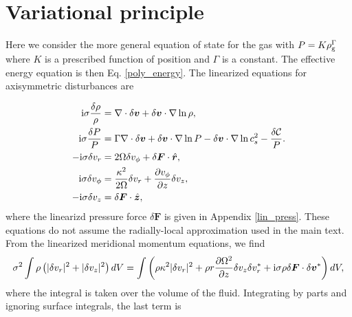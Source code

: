 \section{Variational principle}\label{var_prin}

Here we consider the more general equation of state for the gas with
$P = K \rho_\mathrm{g}^{\Gamma}$ where $K$ is a prescribed function of position
and $\Gamma$ is a constant. The effective energy equation is then
Eq. \ref{poly_energy}. The linearized equations for axisymmetric
disturbances are  

\begin{align}
  \mathrm{i}\sigma\frac{\delta\rho}{\rho} &= \nabla\cdot\delta\bm{v} +
  \delta\bm{v}\cdot\nabla\ln{\rho},\label{lin_mass_full}\\
   \mathrm{i}\sigma\frac{\delta P}{P} &= \Gamma \nabla\cdot\delta\bm{v} +
  \delta\bm{v}\cdot\nabla\ln{P} - \delta\bm{v}\cdot\nabla\ln{c_s^2} - \frac{\delta\mathcal{C}}{P}.\label{lin_energy_full}\\
  -\mathrm{i}\sigma\delta v_r  &= 2\Omega\delta v_\phi + 
  \delta\bm{F}\cdot\hat{\bm{r}},\\
  \mathrm{i}\sigma\delta v_\phi &= \frac{\kappa^2}{2\Omega}\delta v_r + \frac{\partial
    v_\phi}{\partial z}\delta v_z,\\
  -\mathrm{i}\sigma\delta v_z &=  \delta\bm{F}\cdot\hat{\bm{z}}, 
\end{align}  
where the linearizd pressure force $\delta \bm{F}$ is given in
Appendix \ref{lin_press}. These equations do not assume the
radially-local approximation used in the main text. 
From the linearized meridional momentum equations, we find 
\begin{align}
  \sigma^2\int\rho\left(|\delta v_r|^2 + |\delta v_z|^2\right)dV = \int\left( \rho
  \kappa^2 |\delta v_r|^2 + \rho r\frac{\partial \Omega^2}{\partial z} \delta v_z \delta
  v_r^*  + \mathrm{i}\sigma \rho \delta \bm{F}\cdot\delta\bm{v}^*
  \right)dV,
\end{align}
where the integral is taken over the volume of the fluid. Integrating
by parts and ignoring surface integrals, the last term is
